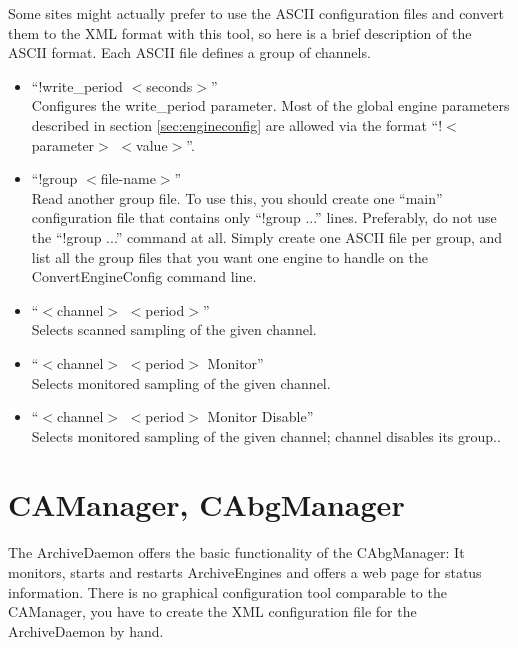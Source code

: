 \noindent Some sites might actually prefer to use the ASCII
configuration files and convert them to the XML format with this tool,
so here is a brief description of the ASCII format.
Each ASCII file defines a group of channels.
\begin{itemize}
\item ``!write\_period $<$seconds$>$''\\
  Configures the write\_period parameter. Most of the global engine
  parameters described in section \ref{sec:engineconfig} are allowed
  via the format ``!$<$parameter$>$ $<$value$>$''.
\item ``!group $<$file-name$>$''\\
  Read another group file.
  To use this, you should create one ``main'' configuration file
  that contains only ``!group ...'' lines.
  Preferably, do not use the ``!group ...'' command at all.
  Simply create one ASCII file per group, and list all the group files
  that you want one engine to handle on the ConvertEngineConfig
  command line.
\item ``$<$channel$>$ $<$period$>$''\\
  Selects scanned sampling of the given channel.
\item ``$<$channel$>$ $<$period$>$ Monitor''\\
  Selects monitored sampling of the given channel.
\item ``$<$channel$>$ $<$period$>$ Monitor Disable''\\
  Selects monitored sampling of the given channel; channel disables
  its group..
\end{itemize}

\section{CAManager, CAbgManager}
The ArchiveDaemon offers the basic functionality of the CAbgManager:
It monitors, starts and restarts ArchiveEngines and offers a web page
for status information.
There is no graphical configuration tool comparable to the CAManager,
you have to create the XML configuration file for the ArchiveDaemon
by hand.


